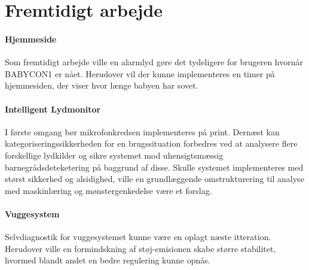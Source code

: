 \chapter{Fremtidigt arbejde}
\label{fremtidigtArbejde}

\subsubsection*{Hjemmeside}
Som fremtidigt arbejde ville en alarmlyd gøre det tydeligere for brugeren hvornår BABYCON1 er nået. Herudover vil der kunne implementeres en timer på hjemmesiden, der viser hvor længe babyen har sovet. 

\subsubsection*{Intelligent Lydmonitor}
I første omgang bør mikrofonkredsen implementeres på print. Dernæst kan kategoriseringssikkerheden for en brugssituation forbedres ved at analysere flere forskellige lydkilder og sikre systemet mod uhensigtsmæssig barnegrådsdeteketering på baggrund af disse. Skulle systemet implementeres med størst sikkerhed og alsidighed, ville en grundlæggende omstrukturering til analyse med maskinlæring og mønstergenkedelse være et forslag.

\subsubsection*{Vuggesystem}
Selvdiagnostik for vuggesystemet kunne være en oplagt næste itteration. Herudover ville en formindskning af støj-emisionen skabe større stabilitet, hvormed blandt andet en bedre regulering kunne opnås. 

